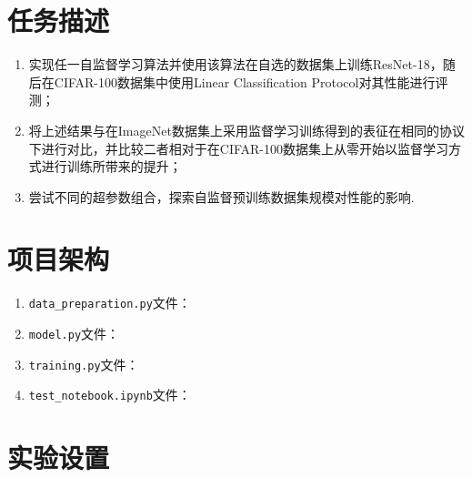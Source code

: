 \documentclass[notitlepage,cs4size,punct,oneside]{ctexrep}
\numberwithin{equation}{chapter}
\theoremstyle{mystyle}
\begin{document}
\section{任务描述}
\begin{enumerate}
\item 实现任一自监督学习算法并使用该算法在自选的数据集上训练ResNet-18，随后在CIFAR-100数据集中使用Linear Classification Protocol对其性能进行评测；
\item 将上述结果与在ImageNet数据集上采用监督学习训练得到的表征在相同的协议下进行对比，并比较二者相对于在CIFAR-100数据集上从零开始以监督学习方式进行训练所带来的提升；
\item 尝试不同的超参数组合，探索自监督预训练数据集规模对性能的影响.
\end{enumerate}

\section{项目架构}
\begin{enumerate}
    \item \texttt{data\_preparation.py}文件：
    \item \texttt{model.py}文件：
    \item \texttt{training.py}文件：
    \item \texttt{test\_notebook.ipynb}文件：
    \end{enumerate}

\section{实验设置}
\end{document}
